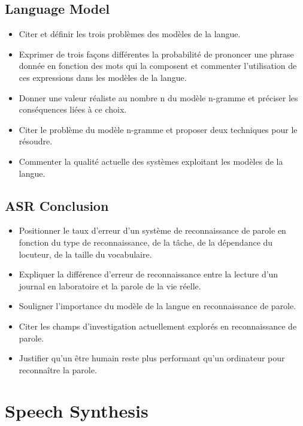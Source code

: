 \documentclass[letterpaper, 12pt]{article}
\begin{document}
	\subsection{Language Model}
		\begin{itemize}
			\setlength{\itemsep}{0pt}		
			\setlength{\parskip}{0pt}		
			\setlength{\parsep}{0pt}	
			\item Citer et définir les trois problèmes des modèles de la langue.
			\item Exprimer de trois façons différentes la probabilité de prononcer une phrase donnée en fonction 
				des mots qui la composent et commenter l'utilisation de ces expressions dans les modèles de la langue.
			\item Donner une valeur réaliste au nombre n du modèle n-gramme et préciser les conséquences liées 
				à ce choix.
			\item Citer le problème du modèle n-gramme et proposer deux techniques pour le résoudre.
			\item Commenter la qualité actuelle des systèmes exploitant les modèles de la langue.
		\end{itemize}	
	\subsection{ASR Conclusion}
		\begin{itemize}
			\setlength{\itemsep}{0pt}		
			\setlength{\parskip}{0pt}		
			\setlength{\parsep}{0pt}	
			\item Positionner le taux d'erreur d'un système de reconnaissance de parole en fonction du type 
				de reconnaissance, de la tâche, de la dépendance du locuteur, de la taille du vocabulaire.
			\item Expliquer la différence d'erreur de reconnaissance entre la lecture d'un journal en laboratoire 
				et la parole de la vie réelle.
			\item Souligner l'importance du modèle de la langue en reconnaissance de parole.
			\item Citer les champs d'investigation actuellement explorés en reconnaissance de parole.
			\item Justifier qu'un être humain reste plus performant qu'un ordinateur pour reconnaître la parole.
		\end{itemize}
\section{Speech Synthesis}
\end{document}

